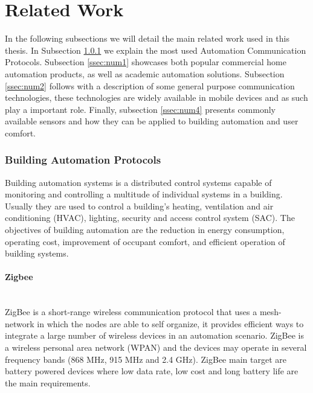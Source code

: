 \chapter{Related Work}
\label{chapter:relatedwork}



In the following subsections we will detail the main related work used in this thesis. In Subsection \ref{ssec:num3} we explain the most used Automation Communication Protocols. Subsection \ref{ssec:num1} showcases both popular commercial home automation products, as well as academic automation solutions.
Subsection \ref{ssec:num2} follows with a description of some general purpose communication technologies, these technologies are widely available in mobile devices and as such play a important role.
 Finally, subsection \ref{ssec:num4} presents commonly available sensors and how they can be applied to building automation and user comfort.



\subsection{Building Automation Protocols} \label{ssec:num3}

Building automation systems is a distributed control systems capable of monitoring and controlling a multitude of individual systems in a building. Usually they are used to control a building's heating, ventilation and air conditioning (HVAC), lighting, security and access control system (SAC).
The objectives of building automation are the reduction in energy consumption, operating cost, improvement of occupant comfort, and efficient operation of building systems.

\subsubsection{Zigbee}\label{zigbee_sub} \mbox{}\\

ZigBee \cite{livro_zigbee} is a short-range wireless communication protocol that uses a mesh-network in which the nodes are able to self organize, it  provides efficient ways to integrate a large number of wireless devices in an automation scenario. ZigBee is a wireless personal area network (WPAN) and the devices may operate in several frequency bands (868 MHz, 915 MHz and 2.4 GHz). ZigBee main target are battery powered devices where low data rate, low cost and long battery life are the main requirements.

